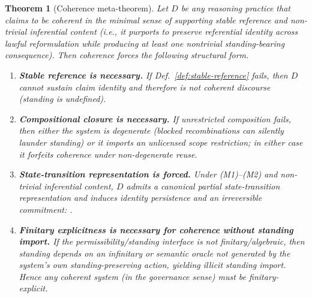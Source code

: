 \documentclass[11pt]{article}
\newtheorem{theorem}{Theorem}[section]
\theoremstyle{definition}
\begin{document}
\begin{theorem}[Coherence meta-theorem]
\label{thm:coherence-meta}
Let $D$ be any reasoning practice that \emph{claims} to be coherent in the minimal sense of supporting stable reference and non-trivial inferential content (i.e., it purports to preserve referential identity across lawful reformulation while producing at least one nontrivial standing-bearing consequence).
Then coherence forces the following structural form.
\begin{enumerate}[label=\textbf{(M\arabic*)}, leftmargin=2.4em]
\item \textbf{Stable reference is necessary.} If Def.~\ref{def:stable-reference} fails, then $D$ cannot sustain claim identity and therefore is not coherent discourse (standing is undefined).
\item \textbf{Compositional closure is necessary.} If unrestricted composition fails, then either the system is degenerate (blocked recombinations can silently launder standing) or it imports an unlicensed scope restriction; in either case it forfeits coherence under non-degenerate reuse.
\item \textbf{State-transition representation is forced.} Under (M1)--(M2) and non-trivial inferential content, $D$ admits a canonical partial state-transition representation and induces identity persistence and an irreversible commitment: .
\item \textbf{Finitary explicitness is necessary for coherence without standing import.} If the permissibility/standing interface is not finitary/algebraic, then standing depends on an infinitary or semantic oracle not generated by the system's own standing-preserving action, yielding illicit standing import. Hence any coherent system (in the governance sense) must be finitary-explicit.
\end{enumerate}
\end{theorem}
\end{document}
